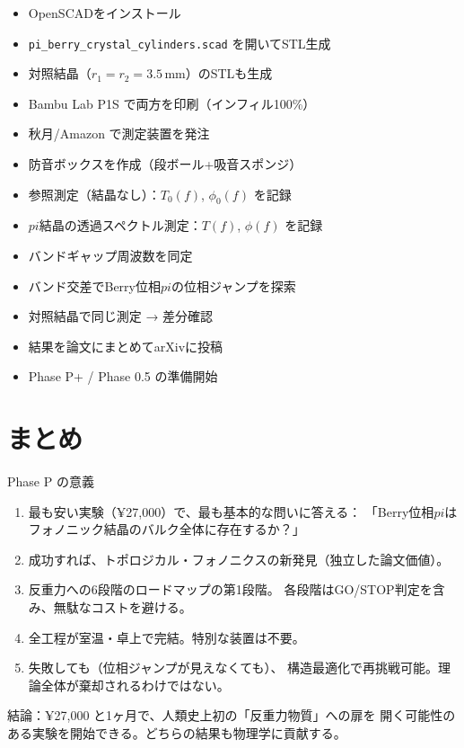 \documentclass[11pt,a4paper]{article}
\def\pi{pi}%
\def\textbf#1{#1}%
\begin{document}
\begin{itemize}
\item[$\square$] OpenSCADをインストール
\item[$\square$] \texttt{pi\_berry\_crystal\_cylinders.scad} を開いてSTL生成
\item[$\square$] 対照結晶（$r_1 = r_2 = 3.5$\,mm）のSTLも生成
\item[$\square$] Bambu Lab P1S で両方を印刷（インフィル100\%）
\item[$\square$] 秋月/Amazon で測定装置を発注
\item[$\square$] 防音ボックスを作成（段ボール+吸音スポンジ）
\item[$\square$] 参照測定（結晶なし）：$T_0(f)$, $\phi_0(f)$ を記録
\item[$\square$] $\pi$結晶の透過スペクトル測定：$T(f)$, $\phi(f)$ を記録
\item[$\square$] バンドギャップ周波数を同定
\item[$\square$] バンド交差でBerry位相$\pi$の位相ジャンプを探索
\item[$\square$] 対照結晶で同じ測定 → 差分確認
\item[$\square$] 結果を論文にまとめてarXivに投稿
\item[$\square$] Phase P+ / Phase 0.5 の準備開始
\end{itemize}


\section{まとめ}

\begin{tcolorbox}[colback=green!5,colframe=green!60!black]
\textbf{Phase P の意義}

\begin{enumerate}
\item 最も安い実験（¥27,000）で、最も基本的な問いに答える：
  「Berry位相$\pi$はフォノニック結晶のバルク全体に存在するか？」

\item 成功すれば、トポロジカル・フォノニクスの新発見（独立した論文価値）。

\item 反重力への6段階のロードマップの第1段階。
  各段階はGO/STOP判定を含み、無駄なコストを避ける。

\item 全工程が室温・卓上で完結。特別な装置は不要。

\item 失敗しても（位相ジャンプが見えなくても）、
  構造最適化で再挑戦可能。理論全体が棄却されるわけではない。
\end{enumerate}

\textbf{結論}：¥27,000 と1ヶ月で、人類史上初の「反重力物質」への扉を
開く可能性のある実験を開始できる。どちらの結果も物理学に貢献する。
\end{tcolorbox}
\end{document}
